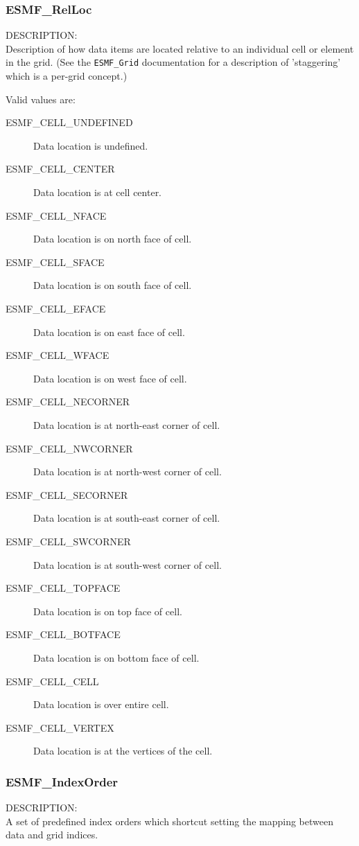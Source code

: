 

\subsubsection{ESMF\_RelLoc}

{\sf DESCRIPTION:\\}
Description of how data items are located relative to an individual
cell or element in the grid. 
(See the {\tt ESMF\_Grid} documentation
for a description of 'staggering' which is a per-grid concept.)

Valid values are:
\begin{description}
  \item[ESMF\_CELL\_UNDEFINED]  Data location is undefined.
  \item[ESMF\_CELL\_CENTER] Data location is at cell center.
  \item[ESMF\_CELL\_NFACE] Data location is on north face of cell.
  \item[ESMF\_CELL\_SFACE] Data location is on south face of cell.
  \item[ESMF\_CELL\_EFACE] Data location is on east face of cell.
  \item[ESMF\_CELL\_WFACE] Data location is on west face of cell.
  \item[ESMF\_CELL\_NECORNER] Data location is at north-east corner of cell.
  \item[ESMF\_CELL\_NWCORNER] Data location is at north-west corner of cell.
  \item[ESMF\_CELL\_SECORNER] Data location is at south-east corner of cell.
  \item[ESMF\_CELL\_SWCORNER] Data location is at south-west corner of cell.
  \item[ESMF\_CELL\_TOPFACE] Data location is on top face of cell.
  \item[ESMF\_CELL\_BOTFACE] Data location is on bottom face of cell.
  \item[ESMF\_CELL\_CELL] Data location is over entire cell.
  \item[ESMF\_CELL\_VERTEX] Data location is at the vertices of the cell.
\end{description}

\subsubsection{ESMF\_IndexOrder}

{\sf DESCRIPTION:\\}
A set of predefined index orders which shortcut setting
the mapping between data and grid indices.

